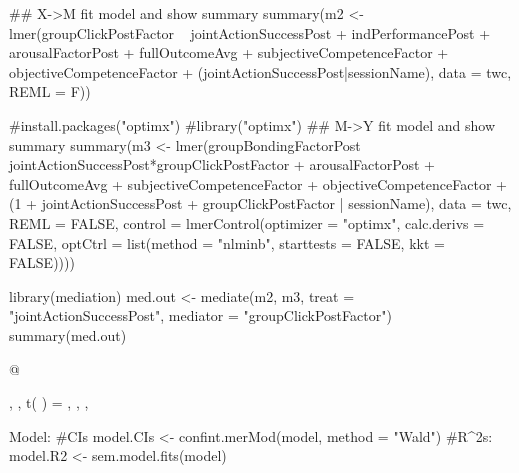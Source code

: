 ## X->M fit model and show summary
summary(m2 <- lmer(groupClickPostFactor ~ jointActionSuccessPost +
                                          indPerformancePost + arousalFactorPost + fullOutcomeAvg +
                                          subjectiveCompetenceFactor + objectiveCompetenceFactor +
                                          (jointActionSuccessPost|sessionName),
                                          data = twc,
                                          REML = F))

#install.packages("optimx")
#library("optimx")
## M->Y fit model and show summary
summary(m3 <- lmer(groupBondingFactorPost ~ jointActionSuccessPost*groupClickPostFactor +
                                            arousalFactorPost + fullOutcomeAvg +
                                            subjectiveCompetenceFactor + objectiveCompetenceFactor + (1 + jointActionSuccessPost + groupClickPostFactor | sessionName),
                                            data = twc, REML = FALSE, control = lmerControl(optimizer = "optimx", calc.derivs = FALSE, optCtrl = list(method = "nlminb", starttests = FALSE, kkt = FALSE))))

library(mediation)
med.out <- mediate(m2, m3, treat = "jointActionSuccessPost", mediator = "groupClickPostFactor")
summary(med.out)


@


\betaest
\CIstart
,
\CIfinish
\SE
,
t(
  )
=
,
\pvalue
,
,














Model:
#CIs
model.CIs <- confint.merMod(model, method = "Wald")
#R^2s:
model.R2 <- sem.model.fits(model)

